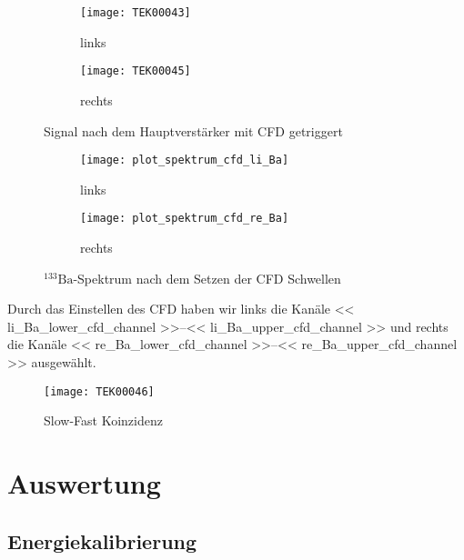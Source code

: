 \documentclass[11pt, ngerman, fleqn, DIV=15, headinclude, BCOR=2cm]{scrreprt}
\begin{document}

\begin{figure}
	\centering
	\begin{subfigure}{0.49 \textwidth}
		\texttt{[image: TEK00043]}
		\caption{%
			links
		}
		\label{fig:ba_fast_signal_cfd_trig-li}
	\end{subfigure}
	\begin{subfigure}{0.49 \textwidth}
		\texttt{[image: TEK00045]}
		\caption{%
			rechts
		}
		\label{fig:ba_fast_signal_cfd_trig-re}
	\end{subfigure}
	\caption{%
		Signal nach dem Hauptverstärker mit CFD getriggert
	}
	\label{fig:ba_fast_signal_cfd_trig}
\end{figure}

\begin{figure}
	\centering
	\begin{subfigure}{0.49 \textwidth}
		\texttt{[image: plot\_spektrum\_cfd\_li\_Ba]}
		\caption{%
			links
		}
		\label{fig:ba_fast_signal_cfd_plot-li}
	\end{subfigure}
	\begin{subfigure}{0.49 \textwidth}
		\texttt{[image: plot\_spektrum\_cfd\_re\_Ba]}
		\caption{%
			rechts
		}
		\label{fig:ba_fast_signal_cfd_plot-re}
	\end{subfigure}
	\caption{%
		$^{133}\text{Ba}$-Spektrum nach dem Setzen der CFD Schwellen
	}
	\label{fig:ba_fast_signal_cfd_plot}
\end{figure}

Durch das Einstellen des CFD haben wir links die Kanäle
\numrange{<< li_Ba_lower_cfd_channel >>}{<< li_Ba_upper_cfd_channel >>} und rechts
die Kanäle
\numrange{<< re_Ba_lower_cfd_channel >>}{<< re_Ba_upper_cfd_channel >>} ausgewählt.


\begin{figure}
	\centering
	\texttt{[image: TEK00046]}
	\caption{%
		Slow-Fast Koinzidenz
	}
	\label{fig:ba_slow_fast_koinzidenz}
\end{figure}

\fehlt%

\chapter{Auswertung}
\section{Energiekalibrierung}
\end{document}
